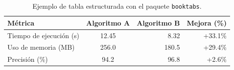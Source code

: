 \begin{table}[htbp]
    \centering
    \caption{Ejemplo de tabla estructurada con el paquete \texttt{booktabs}.}
    \label{tab:ejemplo_metricas}
    \begin{tabular}{lcrr}
        \toprule
        \textbf{Métrica} & \textbf{Algoritmo A} & \textbf{Algoritmo B} & \textbf{Mejora (\%)} \\
        \midrule
        Tiempo de ejecución (s) & 12.45 & 8.32 & +33.1\% \\
        Uso de memoria (MB)    & 256.0 & 180.5 & +29.4\% \\
        Precisión (\%)         & 94.2  & 96.8  & +2.6\%  \\
        \bottomrule
    \end{tabular}
\end{table}
